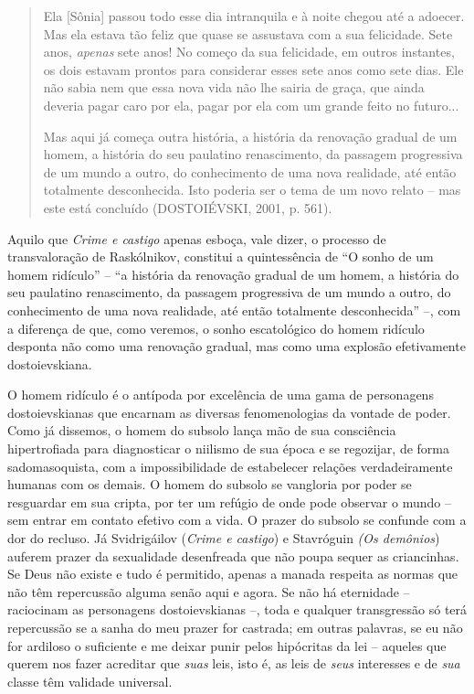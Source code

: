 \begin{quote}
Ela {[}Sônia{]} passou todo esse dia intranquila e à noite chegou até a
adoecer. Mas ela estava tão feliz que quase se assustava com a sua
felicidade. Sete anos, \emph{apenas} sete anos! No começo da sua
felicidade, em outros instantes, os dois estavam prontos para considerar
esses sete anos como sete dias. Ele não sabia nem que essa nova vida não
lhe sairia de graça, que ainda deveria pagar caro por ela, pagar por ela
com um grande feito no futuro...

Mas aqui já começa outra história, a história da renovação gradual de um
homem, a história do seu paulatino renascimento, da passagem progressiva
de um mundo a outro, do conhecimento de uma nova realidade, até então
totalmente desconhecida. Isto poderia ser o tema de um novo relato --
mas este está concluído (DOSTOIÉVSKI, 2001, p. 561).
\end{quote}

Aquilo que \emph{Crime e castigo} apenas esboça, vale dizer, o processo
de transvaloração de Raskólnikov, constitui a quintessência de ``O sonho
de um homem ridículo'' -- ``a história da renovação gradual de um homem,
a história do seu paulatino renascimento, da passagem progressiva de um
mundo a outro, do conhecimento de uma nova realidade, até então
totalmente desconhecida'' --, com a diferença de que, como veremos, o
sonho escatológico do homem ridículo desponta não como uma renovação
gradual, mas como uma explosão efetivamente dostoievskiana.

O homem ridículo é o antípoda por excelência de uma gama de personagens
dostoievskianas que encarnam as diversas fenomenologias da vontade de
poder. Como já dissemos, o homem do subsolo lança mão de sua consciência
hipertrofiada para diagnosticar o niilismo de sua época e se regozijar,
de forma sadomasoquista, com a impossibilidade de estabelecer relações
verdadeiramente humanas com os demais. O homem do subsolo se vangloria
por poder se resguardar em sua cripta, por ter um refúgio de onde pode
observar o mundo -- sem entrar em contato efetivo com a vida. O prazer
do subsolo se confunde com a dor do recluso. Já Svidrigáilov
(\emph{Crime e castigo}) e Stavróguin \emph{(Os demônios}) auferem
prazer da sexualidade desenfreada que não poupa sequer as criancinhas.
Se Deus não existe e tudo é permitido, apenas a manada respeita as
normas que não têm repercussão alguma senão aqui e agora. Se não há
eternidade -- raciocinam as personagens dostoievskianas --, toda e
qualquer transgressão só terá repercussão se a sanha do meu prazer for
castrada; em outras palavras, se eu não for ardiloso o suficiente e me
deixar punir pelos hipócritas da lei -- aqueles que querem nos fazer
acreditar que \emph{suas} leis, isto é, as leis de \emph{seus}
interesses e de \emph{sua} classe têm validade universal.

